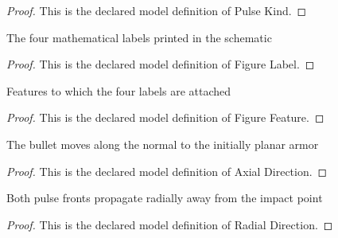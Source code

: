 \begin{proof}
  This is the declared model definition of Pulse Kind.
\end{proof}
\begin{definition}
  \label{def:physics:phyx-mini-0304:phyxminiproblems-problemphyxmini0304-figurelabel}
  The four mathematical labels printed in the schematic
\end{definition}
\begin{proof}
  This is the declared model definition of Figure Label.
\end{proof}
\begin{definition}
  \label{def:physics:phyx-mini-0304:phyxminiproblems-problemphyxmini0304-figurefeature}
  Features to which the four labels are attached
\end{definition}
\begin{proof}
  This is the declared model definition of Figure Feature.
\end{proof}
\begin{definition}
  \label{def:physics:phyx-mini-0304:phyxminiproblems-problemphyxmini0304-axialdirection}
  The bullet moves along the normal to the initially planar armor
\end{definition}
\begin{proof}
  This is the declared model definition of Axial Direction.
\end{proof}
\begin{definition}
  \label{def:physics:phyx-mini-0304:phyxminiproblems-problemphyxmini0304-radialdirection}
  Both pulse fronts propagate radially away from the impact point
\end{definition}
\begin{proof}
  This is the declared model definition of Radial Direction.
\end{proof}
